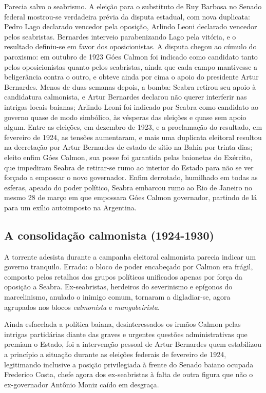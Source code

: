 Parecia salvo o seabrismo. A eleição para o substituto de Ruy Barbosa no Senado federal mostrou-se verdadeira prévia da disputa estadual, com nova duplicata: Pedro Lago declarado vencedor pela oposição, Arlindo Leoni declarado vencedor pelos seabristas. Bernardes interveio parabenizando Lago pela vitória, e o resultado definiu-se em favor dos oposicionistas. A disputa chegou ao cúmulo do paroxismo: em outubro de 1923 Góes Calmon foi indicado como candidato tanto pelos oposicionistas quanto pelos seabristas, ainda que cada campo mantivesse a beligerância contra o outro, e obteve ainda por cima o apoio do presidente Artur Bernardes. Menos de duas semanas depois, a bomba: Seabra retirou seu apoio à candidatura calmonista, e Artur Bernardes declarou não querer interferir nas intrigas locais baianas; Arlindo Leoni foi indicado por Seabra como candidato ao governo quase de modo simbólico, às vésperas das eleições e quase sem apoio algum. Entre as eleições, em dezembro de 1923, e a proclamação do resultado, em fevereiro de 1924, as tensões aumentaram, e mais uma duplicata eleitoral resultou na decretação por Artur Bernardes de estado de sítio na Bahia por trinta dias; eleito enfim Góes Calmon, sua posse foi garantida pelas baionetas do Exército, que impediram Seabra de retirar-se rumo ao interior do Estado para não se ver forçado a empossar o novo governador. Enfim derrotado, humilhado em todas as esferas, apeado do poder político, Seabra embarcou rumo ao Rio de Janeiro no mesmo 28 de março em que empossara Góes Calmon governador, partindo de lá para um exílio autoimposto na Argentina.

\subsection{A consolidação calmonista (1924-1930)}

A torrente adesista durante a campanha eleitoral calmonista parecia indicar um governo tranquilo. Errado: o bloco de poder encabeçado por Calmon era frágil, composto pelos retalhos dos grupos políticos unificados apenas por força da oposição a Seabra. Ex-seabristas, herdeiros do severinismo e epígonos do marcelinismo, anulado o inimigo comum, tornaram a digladiar-se, agora agrupados nos blocos \textit{calmonista} e \textit{mangabeirista}. 

Ainda esfacelada a política baiana, desinteressados os irmãos Calmon pelas intrigas partidárias diante das graves e urgentes questões administrativas que premiam o Estado, foi a intervenção pessoal de Artur Bernardes quem estabilizou a princípio a situação durante as eleições federais de fevereiro de 1924, legitimando inclusive a posição privilegiada à frente do Senado baiano ocupada Frederico Costa, chefe agora dos ex-seabristas à falta de outra figura que não o ex-governador Antônio Moniz caído em desgraça. 

